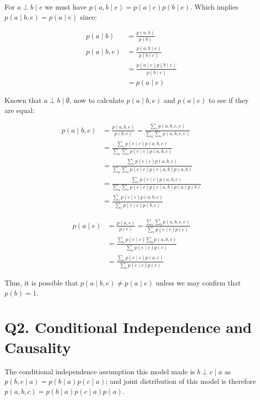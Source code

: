 \documentclass[11pt]{article}
\begin{document}
For $a \perp b \mid e$ we must have $p(a, b \mid e) = p(a \mid e) p(b \mid e)$. Which implies $p(a \mid b, e) = p(a \mid e)$ since:

\begin{align*}
    p(a \mid b) &= \frac{p(a, b)}{p(b)} \\
    p(a \mid b, e) &= \frac{p(a, b \mid e)}{p(b \mid e)} \\
    &= \frac{p(a \mid e) p(b \mid e)}{p(b \mid e)} \\
    &= p(a \mid e)
\end{align*}

Known that $a \perp b \mid \emptyset$, now to calculate $p(a \mid b, e)$ and $p(a \mid e)$ to see if they are equal:

\begin{align*}
    p(a \mid b,e) &= \frac{p(a,b,e)}{p(b,e)} = \frac{\sum_c p(a,b,c,e)}{\sum_a\sum_c p(a,b,c,e)}\\
    &= \frac{\sum_c p(e \mid c)p(a,b,c)}{\sum_a\sum_c p(e \mid c)p(a,b,c)}\\
    &= \frac{\sum_c p(e \mid c)p(a,b,c)}{\sum_a\sum_c p(e \mid c)p(c \mid a, b) p(a, b)}\\
    &= \frac{\sum_c p(e \mid c)p(a,b,c)}{\sum_a\sum_c p(e \mid c)p(c \mid a, b) p(a) p(b)}\\
    &= \frac{\sum_c p(e \mid c)p(a,b,c)}{\sum_c p(e \mid c)p(b, c)}
\end{align*}

\begin{align*}
    p(a \mid e) &= \frac{p(a,e)}{p(e)} = \frac{\sum_c\sum_b p(a,b,c,e)}{\sum_c p(e \mid c)p(c)}\\
    &= \frac{\sum_c p(e \mid c) \sum_b p(a,b,c)}{\sum_c p(e \mid c)p(c)}\\
    &= \frac{\sum_c p(e \mid c) p(a,c)}{\sum_c p(e \mid c)p(c)}
\end{align*}


Thus, it is possible that $p(a \mid b,e) \neq p(a \mid e)$ unless we may confirm that $p(b) = 1$.


\section*{Q2. Conditional Independence and Causality}

The conditional independence assumption this model made is $b \perp c \mid a$ as $p(b, c \mid a) = p(b \mid a) p(c \mid a)$; and joint distribution of this model is therefore $p(a, b, c) = p(b\mid  a)p(c\mid a)p(a)$.
\end{document}
